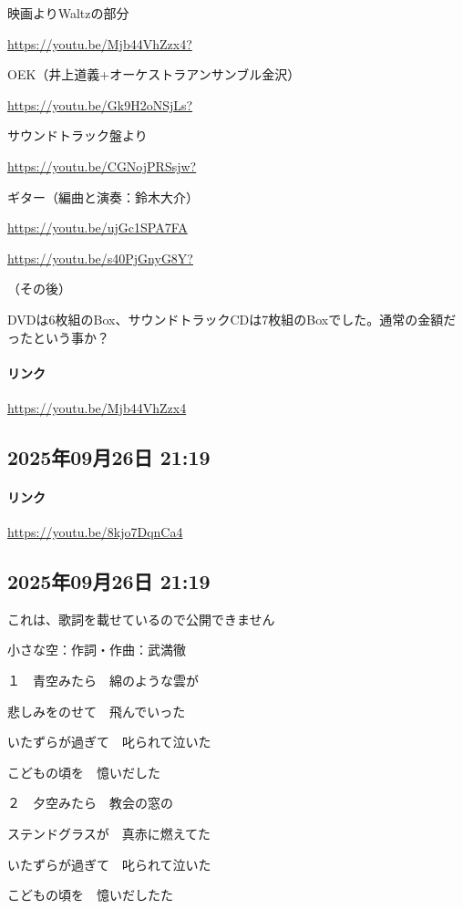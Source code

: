 映画よりWaltzの部分

\url{https://youtu.be/Mjb44VhZzx4?}

OEK（井上道義+オーケストラアンサンブル金沢）

\url{https://youtu.be/Gk9H2oNSjLs?}

サウンドトラック盤より

\url{https://youtu.be/CGNojPRSsjw?}

ギター（編曲と演奏：鈴木大介）

\url{https://youtu.be/ujGc1SPA7FA}

\url{https://youtu.be/s40PjGnyG8Y?}

（その後）

DVDは6枚組のBox、サウンドトラックCDは7枚組のBoxでした。通常の金額だったという事か？

\paragraph{リンク}
\url{https://youtu.be/Mjb44VhZzx4}

\subsection*{2025年09月26日 21:19}

\paragraph{リンク}
\url{https://youtu.be/8kjo7DqnCa4}

\subsection*{2025年09月26日 21:19}

これは、歌詞を載せているので公開できません

小さな空：作詞・作曲：武満徹

１　青空みたら　綿のような雲が

悲しみをのせて　飛んでいった

いたずらが過ぎて　叱られて泣いた

こどもの頃を　憶いだした

２　夕空みたら　教会の窓の

ステンドグラスが　真赤に燃えてた

いたずらが過ぎて　叱られて泣いた

こどもの頃を　憶いだしたた

